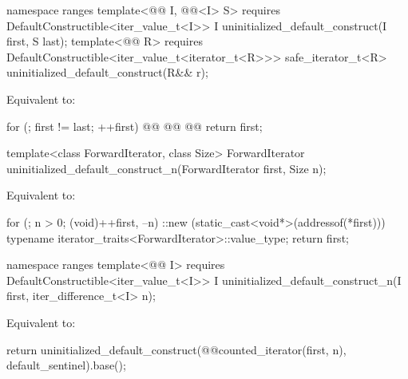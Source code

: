 \begin{addedblock}
%
\begin{itemdecl}
namespace ranges {
  template<@@ I, @@<I> S>
      requires DefaultConstructible<iter_value_t<I>>
    I uninitialized_default_construct(I first, S last);
  template<@@ R>
      requires DefaultConstructible<iter_value_t<iterator_t<R>>>
    safe_iterator_t<R> uninitialized_default_construct(R&& r);
}
\end{itemdecl}

\begin{itemdescr}
\pnum
\effects Equivalent to:
\begin{codeblock}
for (; first != last; ++first)
  @@
    @@
  @@
return first;
\end{codeblock}
\end{itemdescr}
\end{addedblock}

%
\begin{itemdecl}
template<class ForwardIterator, class Size>
  ForwardIterator uninitialized_default_construct_n(ForwardIterator first, Size n);
\end{itemdecl}

\begin{itemdescr}
\pnum
\effects
Equivalent to:
\begin{codeblock}
for (; n > 0; (void)++first, --n)
  ::new (static_cast<void*>(addressof(*first)))
    typename iterator_traits<ForwardIterator>::value_type;
return first;
\end{codeblock}
\end{itemdescr}

\begin{addedblock}
%
\begin{itemdecl}
namespace ranges {
  template<@@ I>
      requires DefaultConstructible<iter_value_t<I>>
    I uninitialized_default_construct_n(I first, iter_difference_t<I> n);
}
\end{itemdecl}

\begin{itemdescr}
\pnum
\effects Equivalent to:
\begin{codeblock}
return uninitialized_default_construct(@@counted_iterator(first, n),
                                       default_sentinel{}).base();
\end{codeblock}
\end{itemdescr}
\end{addedblock}

